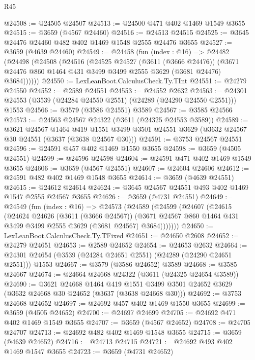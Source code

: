 \begin{lexlean}{R45}
\begin{coremodule}
@24508 := @24505 @24507
@24513 := @24500 @471 @402 @1469 @1549 @3655
@24515 := @3659 (@4567 @24460)
@24516 := @24513 @24515
@24525 := @3645 @24476 @24460 @482 @402 @1469 @1548 @2555 @24476 @3655
@24527 := @3659 (@4639 @24460)
@24549 := @24458
    (fun (index : @16) =>
    @24482
      (@24498
        (@24508
          (@24516
            (@24525
              @24527
              (@3611 (@3666 @24476))
              (@3671 @24476 @860 @1464 @431 @3499 @3499 @2555 @3629 (@3681 @24476) @3684))))))
@24550 := LexLeanBoot.CalculusCheck.Ty.TInt
@24551 := @24279 @24550
@24552 := @2589 @24551
@24553 := @24552 @2632
@24563 := @24301 @24553 (@3539 (@24284 @24550 @2551) (@24289 (@24290 @24550 @2551))) @1553
@24566 := @3579 (@3586 @24551) @3589
@24567 := @3585 @24566
@24573 := @24563 @24567 @24322 (@3611 (@24325 @24553 @3589))
@24589 := @3621
    @24567
    @1464
    @419
    @1551
    @3499
    @3501
    @24551
    @3629
    (@3632 @24567 @30 @24551 (@3637 (@3638 @24567 @30)))
@24591 := @3753 @24567 @24551
@24596 := @24591 @457 @402 @1469 @1550 @3655
@24598 := @3659 (@4505 @24551)
@24599 := @24596 @24598
@24604 := @24591 @471 @402 @1469 @1549 @3655
@24606 := @3659 (@4567 @24551)
@24607 := @24604 @24606
@24612 := @24591 @482 @402 @1469 @1548 @3655
@24614 := @3659 (@4639 @24551)
@24615 := @24612 @24614
@24624 := @3645 @24567 @24551 @493 @402 @1469 @1547 @2555 @24567 @3655
@24626 := @3659 (@4731 @24551)
@24649 := @24549
    (fun (index : @16) =>
    @24573
      (@24589
        (@24599
          (@24607
            (@24615
              (@24624
                @24626
                (@3611 (@3666 @24567))
                (@3671 @24567 @860 @1464 @431 @3499 @3499 @2555 @3629 (@3681 @24567) @3684)))))))
@24650 := LexLeanBoot.CalculusCheck.Ty.TFixed
@24651 := @24650 @2608
@24652 := @24279 @24651
@24653 := @2589 @24652
@24654 := @24653 @2632
@24664 := @24301 @24654 (@3539 (@24284 @24651 @2551) (@24289 (@24290 @24651 @2551))) @1553
@24667 := @3579 (@3586 @24652) @3589
@24668 := @3585 @24667
@24674 := @24664 @24668 @24322 (@3611 (@24325 @24654 @3589))
@24690 := @3621
    @24668
    @1464
    @419
    @1551
    @3499
    @3501
    @24652
    @3629
    (@3632 @24668 @30 @24652 (@3637 (@3638 @24668 @30)))
@24692 := @3753 @24668 @24652
@24697 := @24692 @457 @402 @1469 @1550 @3655
@24699 := @3659 (@4505 @24652)
@24700 := @24697 @24699
@24705 := @24692 @471 @402 @1469 @1549 @3655
@24707 := @3659 (@4567 @24652)
@24708 := @24705 @24707
@24713 := @24692 @482 @402 @1469 @1548 @3655
@24715 := @3659 (@4639 @24652)
@24716 := @24713 @24715
@24721 := @24692 @493 @402 @1469 @1547 @3655
@24723 := @3659 (@4731 @24652)

\end{coremodule}
\end{lexlean}
